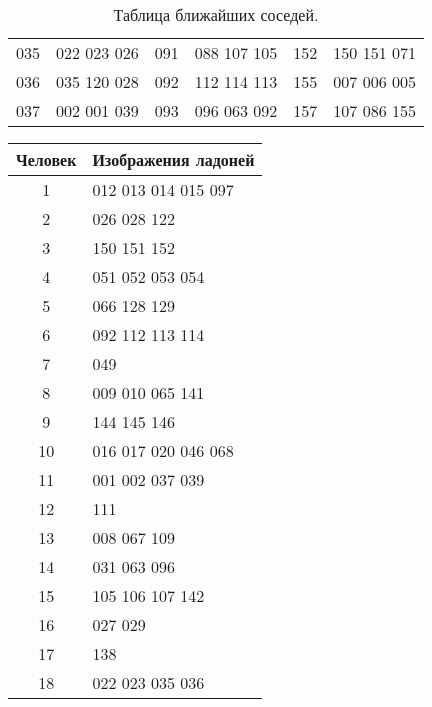 \documentclass[12pt,fleqn]{article}
\begin{document}
\begin{table}[h]
\begin{center}
\begin{tabular}{|c|c|c|c|c|c|}
         035 &            022 023 026  &         091 &            088 107 105  &         152 &            150 151 071  \\
         036 &            035 120 028  &         092 &            112 114 113  &         155 &            007 006 005  \\
         037 &            002 001 039  &         093 &            096 063 092  &         157 &            107 086 155  \\ \hline
\end{tabular}
\caption{Таблица ближайших соседей.}
\label{tabular1}
\end{center}
\end{table}


\begin{table}[H]
\begin{center}
\begin{tabular}{|c|l|}
\toprule
\hline
Человек &               Изображения ладоней \\ \hline
\midrule
       1 &              012 013 014 015 097  \\
       2 &                      026 028 122  \\
       3 &                      150 151 152  \\
       4 &                  051 052 053 054  \\
       5 &                      066 128 129  \\
       6 &                  092 112 113 114  \\
       7 &                              049  \\
       8 &                  009 010 065 141  \\
       9 &                      144 145 146  \\
      10 &              016 017 020 046 068  \\
      11 &                  001 002 037 039  \\
      12 &                              111  \\
      13 &                      008 067 109  \\
      14 &                      031 063 096  \\
      15 &                  105 106 107 142  \\
      16 &                          027 029  \\
      17 &                              138  \\
      18 &                  022 023 035 036  \\

\end{tabular}
\end{center}
\end{table}
\end{document}
